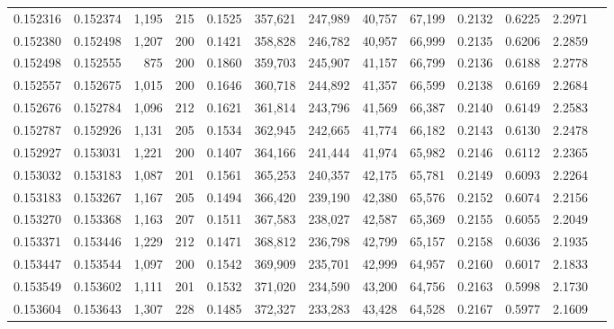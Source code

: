 \begin{tabular}{rrrrrrrrrrrrr}
0.152316 & 0.152374 & 1,195 & 215 &                                     0.1525 & 357,621 & 247,989 &  40,757 &  67,199 & 0.2132 & 0.6225 & 2.2971 \\
0.152380 & 0.152498 & 1,207 & 200 &                                     0.1421 & 358,828 & 246,782 &  40,957 &  66,999 & 0.2135 & 0.6206 & 2.2859 \\
0.152498 & 0.152555 &   875 & 200 &                                     0.1860 & 359,703 & 245,907 &  41,157 &  66,799 & 0.2136 & 0.6188 & 2.2778 \\
0.152557 & 0.152675 & 1,015 & 200 &                                     0.1646 & 360,718 & 244,892 &  41,357 &  66,599 & 0.2138 & 0.6169 & 2.2684 \\
0.152676 & 0.152784 & 1,096 & 212 &                                     0.1621 & 361,814 & 243,796 &  41,569 &  66,387 & 0.2140 & 0.6149 & 2.2583 \\
0.152787 & 0.152926 & 1,131 & 205 &                                     0.1534 & 362,945 & 242,665 &  41,774 &  66,182 & 0.2143 & 0.6130 & 2.2478 \\
0.152927 & 0.153031 & 1,221 & 200 &                                     0.1407 & 364,166 & 241,444 &  41,974 &  65,982 & 0.2146 & 0.6112 & 2.2365 \\
0.153032 & 0.153183 & 1,087 & 201 &                                     0.1561 & 365,253 & 240,357 &  42,175 &  65,781 & 0.2149 & 0.6093 & 2.2264 \\
0.153183 & 0.153267 & 1,167 & 205 &                                     0.1494 & 366,420 & 239,190 &  42,380 &  65,576 & 0.2152 & 0.6074 & 2.2156 \\
0.153270 & 0.153368 & 1,163 & 207 &                                     0.1511 & 367,583 & 238,027 &  42,587 &  65,369 & 0.2155 & 0.6055 & 2.2049 \\
0.153371 & 0.153446 & 1,229 & 212 &                                     0.1471 & 368,812 & 236,798 &  42,799 &  65,157 & 0.2158 & 0.6036 & 2.1935 \\
0.153447 & 0.153544 & 1,097 & 200 &                                     0.1542 & 369,909 & 235,701 &  42,999 &  64,957 & 0.2160 & 0.6017 & 2.1833 \\
0.153549 & 0.153602 & 1,111 & 201 &                                     0.1532 & 371,020 & 234,590 &  43,200 &  64,756 & 0.2163 & 0.5998 & 2.1730 \\
0.153604 & 0.153643 & 1,307 & 228 &                                     0.1485 & 372,327 & 233,283 &  43,428 &  64,528 & 0.2167 & 0.5977 & 2.1609 \\

\end{tabular}
